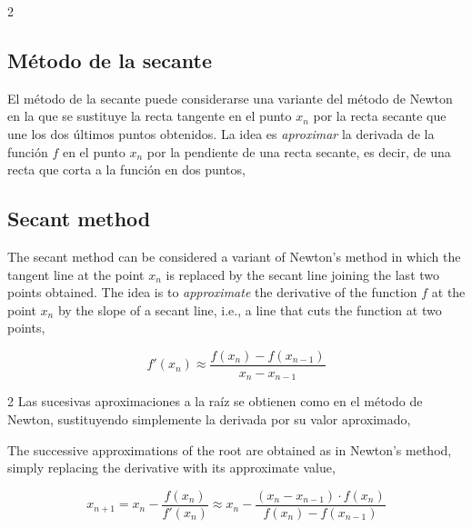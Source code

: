 \begin{paracol}{2}

\subsection{Método de la secante}
El método de la secante puede considerarse una variante del método de Newton en la que se sustituye la recta tangente en el punto $x_n$ por la recta secante que une los dos últimos puntos obtenidos. La idea es \emph{aproximar} la derivada de la función $f$ en el punto $x_n$ por la pendiente de una recta secante, es decir, de una recta que corta a la función en dos puntos,

\switchcolumn

\subsection{Secant method}
The secant method can be considered a variant of Newton's method in which the tangent line at the point $x_n$ is replaced by the secant line joining the last two points obtained. The idea is to \emph{approximate} the derivative of the function $f$ at the point $x_n$ by the slope of a secant line, i.e., a line that cuts the function at two points,
\end{paracol}


\begin{equation*}
f'(x_n)\approx \frac{f(x_n)-f(x_{n-1})}{x_n-x_{n-1}}
\end{equation*}

\begin{paracol}{2}
Las sucesivas aproximaciones a la raíz se obtienen como en el método de Newton, sustituyendo simplemente la derivada por su valor aproximado,

\switchcolumn
The successive approximations of the root are obtained as in Newton's method, simply replacing the derivative with its approximate value,
\end{paracol}

\begin{equation*}
x_{n+1}=x_n-\frac{f(x_n)}{f'(x_n)}\approx x_n-\frac{(x_n-x_{n-1})\cdot f(x_n)}{f(x_n)-f(x_{n-1})}
\end{equation*}

